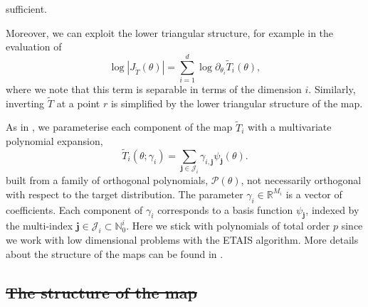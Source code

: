\documentclass[final]{siamltex}
\newcommand{\edit}[1]{{\color{red} #1}}  %
\providecommand{\DIFdel}[1]{{\protect\color{red}\sout{#1}}}                      %
\providecommand{\DIFaddbegin}{} %
\providecommand{\DIFaddend}{} %
\providecommand{\DIFdelbegin}{} %
\providecommand{\DIFdelend}{} %
\newcommand{\DIFscaledelfig}{0.5}
\newlength{\DIFdelgraphicswidth} %
\newlength{\DIFdelgraphicsheight} %
\newcommand{\DIFaddincludegraphics}[2][]{{\color{blue}\fbox{\DIFOincludegraphics[#1]{#2}}}} %
\newcommand{\DIFdelincludegraphics}[2][]{%
\sbox{\DIFdelgraphicsbox}{\DIFOincludegraphics[#1]{#2}}%
\settoboxwidth{\DIFdelgraphicswidth}{\DIFdelgraphicsbox} %
\settoboxtotalheight{\DIFdelgraphicsheight}{\DIFdelgraphicsbox} %
\scalebox{\DIFscaledelfig}{%
\parbox[b]{\DIFdelgraphicswidth}{\usebox{\DIFdelgraphicsbox}\\[-\baselineskip] \rule{\DIFdelgraphicswidth}{0em}}\llap{\resizebox{\DIFdelgraphicswidth}{\DIFdelgraphicsheight}{%
\setlength{\unitlength}{\DIFdelgraphicswidth}%
\begin{picture}(1,1)%
\thicklines\linethickness{2pt} %
{\color[rgb]{1,0,0}\put(0,0){\framebox(1,1){}}}%
{\color[rgb]{1,0,0}\put(0,0){\line( 1,1){1}}}%
{\color[rgb]{1,0,0}\put(0,1){\line(1,-1){1}}}%
\end{picture}%
}\hspace*{3pt}}} %
} %
\DeclareRobustCommand{\DIFaddbegin}{\DIFOaddbegin \let\includegraphics\DIFaddincludegraphics} %
\DeclareRobustCommand{\DIFaddend}{\DIFOaddend \let\includegraphics\DIFOincludegraphics} %
\DeclareRobustCommand{\DIFdelbegin}{\DIFOdelbegin \let\includegraphics\DIFdelincludegraphics} %
\DeclareRobustCommand{\DIFdelend}{\DIFOaddend \let\includegraphics\DIFOincludegraphics} %
\begin{document}
sufficient. \DIFaddbegin \edit{Moreover, we can exploit the lower triangular
  structure, for example in the evaluation of 
\begin{equation}\label{eqn:separable_jacobian}
	\log\left|J_{\tilde{T}}(\theta)\right| = \sum\limits_{i=1}^d \! \log \partial_{\theta_i} \tilde{T}_i(\theta),
\end{equation}
where we note that this term is separable in terms of the dimension
$i$. Similarly, inverting $\tilde{T}$ at a point $r$ is simplified by the lower triangular structure of the map.

As in \cite{parno2018transport}, we parameterise each component of the
map $\tilde{T}_i$ with a multivariate polynomial expansion,
\begin{equation}\label{eq:map_defn}
	\tilde{T}_i(\theta; \gamma_i) = \sum\limits_{\mathbf{j}\in\mathcal{J}_i} \!
\gamma_{i,\mathbf{j}}\psi_\mathbf{j}(\theta).
\end{equation}
built from
a family of orthogonal polynomials, $\mathcal{P}(\theta)$, not
necessarily orthogonal with respect to the target distribution. The parameter $\gamma_i \in \mathbb{R}^{M_i}$ is a vector of coefficients. Each component of $\gamma_i$ corresponds to a basis function
$\psi_\mathbf{j}$, indexed by the multi-index $\mathbf{j} \in
\mathcal{J}_i \subset \mathbb{N}_0^i$. 
Here we stick with polynomials of total order $p$ since we work with
low dimensional problems with the ETAIS algorithm. More details about
the structure of the maps can be found in  \cite{parno2018transport}.}
\DIFaddend 


\DIFdelbegin \subsection{\DIFdel{The structure of the map}}
\addtocounter{subsection}{-1}%
\DIFdelend %
\end{document}
